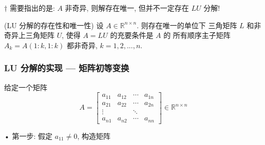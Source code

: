 \documentclass[12pt,a4paper]{article}
\begin{document}
 \begin{framed}
 	$†$ 需要指出的是: $A$ 非奇异, 则解存在唯一, 但并不一定存在 $LU$ 分解!
 \end{framed}

\begin{framed}
	\begin{theorem}(LU 分解的存在性和唯一性)
	设 $A ∈ \mathbb{R}^{n×n}$. 则存在唯一的单位下
	三角矩阵 $L$ 和非奇异上三角矩阵 $U$, 使得 $A = LU$ 的充要条件是 $A$ 的
	所有顺序主子矩阵 $A_k = A(1:k, 1:k)$ 都非奇异, $k = 1, 2, . . . , n.$	
	\end{theorem}
\end{framed}

\newpage
\subsubsection{LU 分解的实现 — 矩阵初等变换}
给定一个矩阵
\begin{equation*}
A=\left[\begin{array}{cccc}{a_{11}} & {a_{12}} & {\cdots} & {a_{1 n}} \\ {a_{21}} & {a_{22}} & {\cdots} & {a_{2 n}} \\ {\vdots} & {} & {\ddots} & {} \\ {a_{n 1}} & {a_{n 2}} & {\cdots} & {a_{n n}}\end{array}\right] \in \mathbb{R}^{n \times n}
\end{equation*}

• 第一步: 假定 $a_{11} \neq  0$, 构造矩阵
\end{document}
